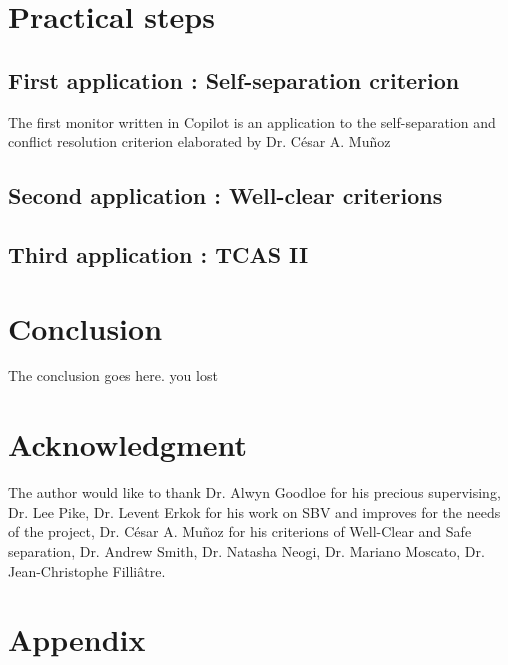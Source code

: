 \documentclass[a4paper,11pt,final]{article}
\begin{document}
  \section{Practical steps}
  \subsection{First application : Self-separation criterion}
  The first monitor written in Copilot is an application to the self-separation and conflict resolution criterion elaborated by Dr. César A. Muñoz  
  
  \subsection{Second application : Well-clear criterions}
  \subsection{Third application : TCAS II}
  
  \section*{Conclusion}
  The conclusion goes here.
  you lost 
  

  \cleardoublepage{}
  
  
  
  
  \section*{Acknowledgment}
  
  The author would like to thank Dr. Alwyn Goodloe for his precious supervising, Dr. Lee Pike, Dr. Levent Erkok for his work on SBV and improves for the needs of the project, Dr. César A. Muñoz for his criterions of Well-Clear and Safe separation, Dr. Andrew Smith, Dr. Natasha Neogi, Dr. Mariano Moscato, Dr. Jean-Christophe Filliâtre.
  
  
  \section*{Appendix}
  
\end{document}
